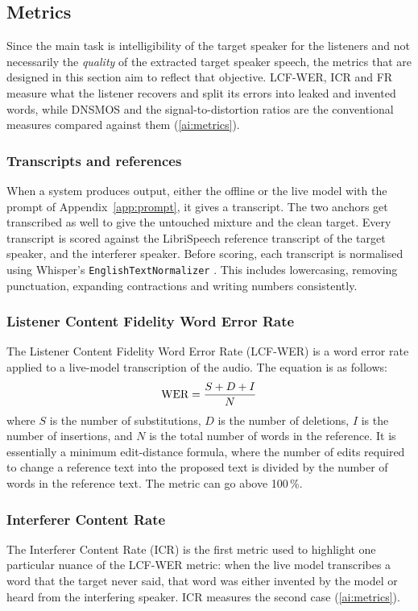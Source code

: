 \subsection{Metrics}
\label{sec:metrics}
 Since the main task is intelligibility of the target speaker for the listeners and not necessarily the \textit{quality} of the extracted target speaker speech, the metrics that are designed in this section aim to reflect that objective. LCF-WER, ICR and FR measure what the listener recovers and split its errors into leaked and invented words, while DNSMOS and the signal-to-distortion ratios are the conventional measures compared against them (\ref{ai:metrics}).

\subsubsection{Transcripts and references}
\label{sec:transcripts}
When a system produces output, either the offline or the live model with the prompt of Appendix~\ref{app:prompt}, it gives a transcript. The two anchors get transcribed as well to give the untouched mixture and the clean target. Every transcript is scored against the LibriSpeech reference transcript of the target speaker, and the interferer speaker. Before scoring, each transcript is normalised using Whisper's \texttt{EnglishTextNormalizer} \cite{whisper_normalizer,radford2023whisper}. This includes lowercasing, removing punctuation, expanding contractions and writing numbers consistently.

\subsubsection{Listener Content Fidelity Word Error Rate}
\label{sec:lcfwer}
The Listener Content Fidelity Word Error Rate (LCF-WER) is a word error rate applied to a live-model transcription of the audio. The equation is as follows:
\begin{equation}
    \textup{WER} = \frac{S + D + I}{N}
\end{equation}
where $S$ is the number of substitutions, $D$ is the number of deletions, $I$ is the number of insertions, and $N$ is the total number of words in the reference. It is essentially a minimum edit-distance formula, where the number of edits required to change a reference text into the proposed text is divided by the number of words in the reference text. The metric can go above 100\,\%.


\subsubsection{Interferer Content Rate}
\label{sec:icr}
The Interferer Content Rate (ICR) is the first metric used to highlight one particular nuance of the LCF-WER metric: when the live model transcribes a word that the target never said, that word was either invented by the model or heard from the interfering speaker. ICR measures the second case (\ref{ai:metrics}).


